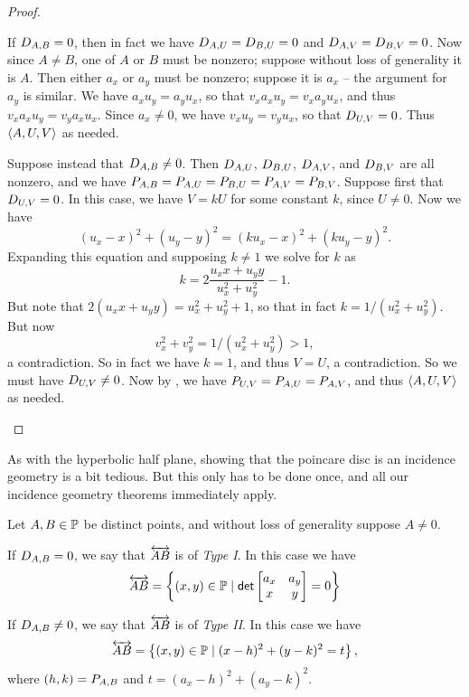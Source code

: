 \begin{proof}
\begin{itemize}
If \(D_{A,B} = 0\), then in fact we have \(D_{A,U} = D_{B,U} = 0\) and \(D_{A,V} = D_{B,V} = 0\).
Now since \(A \neq B\), one of \(A\) or \(B\) must be nonzero; suppose without loss of generality it is \(A\).
Then either \(a_x\) or \(a_y\) must be nonzero; suppose it is \(a_x\) -- the argument for \(a_y\) is similar.
We have \(a_xu_y = a_yu_x\), so that \(v_xa_xu_y = v_xa_yu_x\), and thus \(v_xa_xu_y = v_ya_xu_x\).
Since \(a_x \neq 0\), we have \(v_xu_y = v_yu_x\), so that \(D_{U,V} = 0\).
Thus \(\langle A, U, V \rangle\) as needed.

Suppose instead that \(D_{A,B} \neq 0\).
Then \(D_{A,U}\), \(D_{B,U}\), \(D_{A,V}\), and \(D_{B,V}\) are all nonzero, and we have \(P_{A,B} = P_{A,U} = P_{B,U} = P_{A,V} = P_{B,V}\).
Suppose first that \(D_{U,V} = 0\).
In this case, we have \(V = kU\) for some constant \(k\), since \(U \neq 0\).
Now we have \[ (u_x - x)^2 + (u_y - y)^2 = (ku_x - x)^2 + (ku_y - y)^2. \]
Expanding this equation and supposing \(k \neq 1\) we solve for \(k\) as \[ k = 2\frac{u_xx + u_yy}{u_x^2 + u_y^2} - 1. \]
But note that \(2(u_xx + u_yy) = u_x^2 + u_y^2 + 1\), so that in fact \(k = 1/(u_x^2 + u_y^2)\).
But now \[v_x^2 + v_y^2 = 1/(u_x^2 + u_y^2) > 1,\] a contradiction.
So in fact we have \(k = 1\), and thus \(V = U\), a contradiction.
So we must have \(D_{U,V} \neq 0\).
Now by , we have \(P_{U,V} = P_{A,U} = P_{A,V}\), and thus \(\langle A, U, V \rangle\) as needed.
\qedhere
\end{itemize}
\end{proof}

As with the hyperbolic half plane, showing that the poincare disc is an incidence geometry is a bit tedious.
But this only has to be done once, and all our incidence geometry theorems immediately apply.

\begin{prop}
Let \(A,B \in \mathbb{P}\) be distinct points, and without loss of generality suppose \(A \neq 0\).
\begin{proplist}
\item If \(D_{A,B} = 0\), we say that \(\overleftrightarrow{AB}\) is of \emph{Type I}.
In this case we have \[ \overleftrightarrow{AB} = \left\{ (x,y) \in \mathbb{P} \mid \mathsf{det} \begin{bmatrix} a_x & a_y \\ x & y \end{bmatrix} = 0 \right\} \]
\item If \(D_{A,B} \neq 0\), we say that \(\overleftrightarrow{AB}\) is of \emph{Type II}.
In this case we have \[ \overleftrightarrow{AB} = \left\{ (x,y) \in \mathbb{P} \mid (x - h)^2 + (y - k)^2 = t \right\}, \] where \((h,k) = P_{A,B}\) and \(t = (a_x - h)^2 + (a_y - k)^2\).
\end{proplist}
\end{prop}



